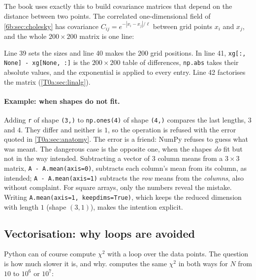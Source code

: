 The book uses exactly this to build covariance matrices that depend on the distance between two points. The correlated one-dimensional field of \cref{6b:sec:cholesky} has covariance $C_{ij}=e^{-|x_i-x_j|/\ell}$ between grid points $x_i$ and $x_j$, and the whole $200\times200$ matrix is one line:


Line 39 sets the sizes and line 40 makes the $200$ grid positions. In line 41, \texttt{xg[:, None] - xg[None, :]} is the $200\times200$ table of differences, \texttt{np.abs} takes their absolute values, and the exponential is applied to every entry. Line 42 factorises the matrix (\cref{T0a:sec:linalg}).

\paragraph{Example: when shapes do not fit.} Adding \texttt{r} of shape \texttt{(3,)} to \texttt{np.ones(4)} of shape \texttt{(4,)} compares the last lengths, $3$ and $4$. They differ and neither is $1$, so the operation is refused with the error quoted in \cref{T0a:sec:anatomy}. The error is a friend: NumPy refuses to guess what was meant. The dangerous case is the opposite one, when the shapes \emph{do} fit but not in the way intended. Subtracting a vector of $3$ column means from a $3\times3$ matrix, \texttt{A - A.mean(axis=0)}, subtracts each column's mean from its column, as intended; \texttt{A - A.mean(axis=1)} subtracts the \emph{row} means from the \emph{columns}, also without complaint. For square arrays, only the numbers reveal the mistake. Writing \texttt{A.mean(axis=1, keepdims=True)}, which keeps the reduced dimension with length $1$ (shape $(3,1)$), makes the intention explicit.

\subsection{Vectorisation: why loops are avoided}
\label{T0a:sec:vectorise}

Python can of course compute $\chi^2$ with a loop over the data points. The question is how much slower it is, and why.  computes the same $\chi^2$ in both ways for $N$ from $10$ to $10^6$ or $10^7$:


